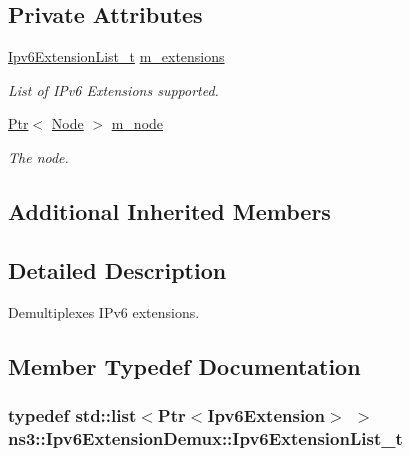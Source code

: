 \subsection*{Private Attributes}
\begin{DoxyCompactItemize}
\item 
\hyperlink{classns3_1_1Ipv6ExtensionDemux_a6e82323377e3ffddf4676830b8e79e4d}{Ipv6\+Extension\+List\+\_\+t} \hyperlink{classns3_1_1Ipv6ExtensionDemux_a177a1ee4f1bed804bbd4733206fdb81b}{m\+\_\+extensions}
\begin{DoxyCompactList}\small\item\em List of I\+Pv6 Extensions supported. \end{DoxyCompactList}\item 
\hyperlink{classns3_1_1Ptr}{Ptr}$<$ \hyperlink{classns3_1_1Node}{Node} $>$ \hyperlink{classns3_1_1Ipv6ExtensionDemux_ab3a2f9746c64ed928a15b640f54d316f}{m\+\_\+node}
\begin{DoxyCompactList}\small\item\em The node. \end{DoxyCompactList}\end{DoxyCompactItemize}
\subsection*{Additional Inherited Members}


\subsection{Detailed Description}
Demultiplexes I\+Pv6 extensions. 

\subsection{Member Typedef Documentation}
\subsubsection[{\texorpdfstring{Ipv6\+Extension\+List\+\_\+t}{Ipv6ExtensionList_t}}]{\setlength{\rightskip}{0pt plus 5cm}typedef {\bf std\+::list}$<${\bf Ptr}$<${\bf Ipv6\+Extension}$>$ $>$ {\bf ns3\+::\+Ipv6\+Extension\+Demux\+::\+Ipv6\+Extension\+List\+\_\+t}\hspace{0.3cm}{\ttfamily [private]}}\hypertarget{classns3_1_1Ipv6ExtensionDemux_a6e82323377e3ffddf4676830b8e79e4d}{}\label{classns3_1_1Ipv6ExtensionDemux_a6e82323377e3ffddf4676830b8e79e4d}


